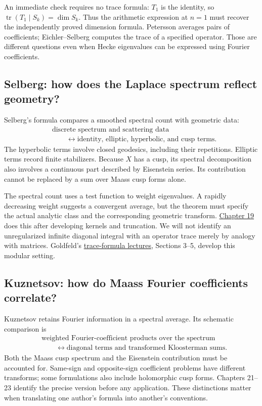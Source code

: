 An immediate check requires no trace formula: \(T_1\) is the identity, so \(\operatorname{tr}(T_1\mid S_k)=\dim S_k\). Thus the arithmetic expression at \(n=1\) must recover the independently proved dimension formula. Petersson averages pairs of coefficients; Eichler--Selberg computes the trace of a specified operator. Those are different questions even when Hecke eigenvalues can be expressed using Fourier coefficients.

\subsection{Selberg: how does the Laplace spectrum reflect geometry?}\label{selberg-preview}

Selberg's formula compares a smoothed spectral count with geometric data:
\[
\begin{aligned}
&\text{discrete spectrum and scattering data}\\
&\qquad\longleftrightarrow
\text{identity, elliptic, hyperbolic, and cusp terms}.
\end{aligned}
\]
The hyperbolic terms involve closed geodesics, including their repetitions. Elliptic terms record finite stabilizers. Because \(X\) has a cusp, its spectral decomposition also involves a continuous part described by Eisenstein series. Its contribution cannot be replaced by a sum over Maass cusp forms alone.

The spectral count uses a test function to weight eigenvalues. A rapidly decreasing weight suggests a convergent average, but the theorem must specify the actual analytic class and the corresponding geometric transform. \hyperref[v1a-ch19]{Chapter 19} does this after developing kernels and truncation. We will not identify an unregularized infinite diagonal integral with an operator trace merely by analogy with matrices. Goldfeld's \href{https://www.math.columbia.edu/~goldfeld/TraceFormulae-4-12-2020.pdf}{trace-formula lectures}, Sections 3--5, develop this modular setting.

\subsection{Kuznetsov: how do Maass Fourier coefficients correlate?}\label{kuznetsov-preview}

Kuznetsov retains Fourier information in a spectral average. Its schematic comparison is
\[
\begin{aligned}
&\text{weighted Fourier-coefficient products over the spectrum}\\
&\qquad\longleftrightarrow
\text{diagonal terms and transformed Kloosterman sums}.
\end{aligned}
\]
Both the Maass cusp spectrum and the Eisenstein contribution must be accounted for. Same-sign and opposite-sign coefficient problems have different transforms; some formulations also include holomorphic cusp forms. Chapters 21--23 identify the precise version before any application. These distinctions matter when translating one author's formula into another's conventions.

